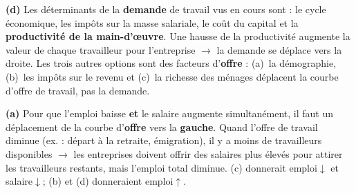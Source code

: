 

\begin{reponse}
\textbf{(d)} Les déterminants de la \textbf{demande} de travail vus en cours sont : le cycle économique, les impôts sur la masse salariale, le coût du capital et la \textbf{productivité de la main-d'{\oe}uvre}. Une hausse de la productivité augmente la valeur de chaque travailleur pour l'entreprise $\to$ la demande se déplace vers la droite. Les trois autres options sont des facteurs d'\textbf{offre} : (a)~la démographie, (b)~les impôts sur le revenu et (c)~la richesse des ménages déplacent la courbe d'offre de travail, pas la demande.
\end{reponse}


\begin{reponse}
\textbf{(a)} Pour que l'emploi baisse \textbf{et} le salaire augmente simultanément, il faut un déplacement de la courbe d'\textbf{offre} vers la \textbf{gauche}. Quand l'offre de travail diminue (ex. : départ à la retraite, émigration), il y a moins de travailleurs disponibles $\to$ les entreprises doivent offrir des salaires plus élevés pour attirer les travailleurs restants, mais l'emploi total diminue. (c) donnerait emploi$\downarrow$ et salaire$\downarrow$; (b) et (d) donneraient emploi$\uparrow$.
\end{reponse}


